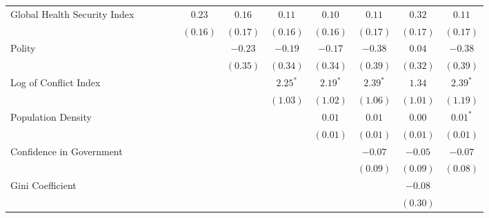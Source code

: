 \documentclass[
  12pt,
]{article}
\begin{document}
\begin{table}
\begin{center}
\begin{footnotesize}
\begin{tabular}{l c c c c c c c c c c c}
Global Health Security Index &             &            &            &              & $0.23$       & $0.16$       & $0.11$       & $0.10$       & $0.11$       & $0.32$      & $0.11$        \\
                             &             &            &            &              & $(0.16)$     & $(0.17)$     & $(0.16)$     & $(0.16)$     & $(0.17)$     & $(0.17)$    & $(0.17)$      \\
Polity                       &             &            &            &              &              & $-0.23$      & $-0.19$      & $-0.17$      & $-0.38$      & $0.04$      & $-0.38$       \\
                             &             &            &            &              &              & $(0.35)$     & $(0.34)$     & $(0.34)$     & $(0.39)$     & $(0.32)$    & $(0.39)$      \\
Log of Conflict Index        &             &            &            &              &              &              & $2.25^{*}$   & $2.19^{*}$   & $2.39^{*}$   & $1.34$      & $2.39^{*}$    \\
                             &             &            &            &              &              &              & $(1.03)$     & $(1.02)$     & $(1.06)$     & $(1.01)$    & $(1.19)$      \\
Population Density           &             &            &            &              &              &              &              & $0.01$       & $0.01$       & $0.00$      & $0.01^{*}$    \\
                             &             &            &            &              &              &              &              & $(0.01)$     & $(0.01)$     & $(0.01)$    & $(0.01)$      \\
Confidence in Government     &             &            &            &              &              &              &              &              & $-0.07$      & $-0.05$     & $-0.07$       \\
                             &             &            &            &              &              &              &              &              & $(0.09)$     & $(0.09)$    & $(0.08)$      \\
Gini Coefficient             &             &            &            &              &              &              &              &              &              & $-0.08$     &               \\
                             &             &            &            &              &              &              &              &              &              & $(0.30)$    &               \\

\end{tabular}
\end{footnotesize}
\end{center}
\end{table}
\end{document}
